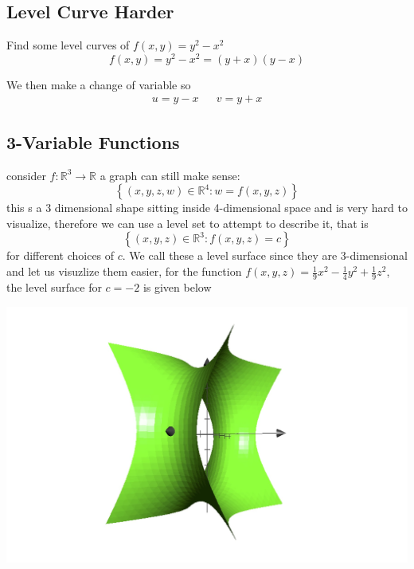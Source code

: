 \documentclass[11pt]{book}
\begin{document}

\subsection{Level Curve Harder}%
\label{sub:level_curve_harder}

Find some level curves of $f\left(x,y\right) = y^2  - x^2 $ 
\[
    f\left(x,y\right) = y^2  - x^2 = \left( y + x \right) \left( y  - x \right) 
\]

We then make a change of variable so 
\begin{align*}
    u = y  - x && v= y + x
\end{align*}




\subsection{3-Variable Functions}%
\label{sub:3_variable_functions}

consider $f : \mathbb{R} ^{3}  \to \mathbb{R} $ a graph can still make sense: 
\[
    \left\{ \left( x,y,z,w \right) \in \mathbb{R} ^{4} : w= f\left(x,y,z\right)  \right\} 
\]
this s a 3 dimensional shape sitting inside 4-dimensional space and is very hard to visualize, therefore we can use a level set to attempt to describe it, that is 
\[
    \left\{ \left( x,y,z \right) \in  \mathbb{R}^{3} : f\left( x,y,z \right) = c \right\} 
\]
for different choices of $c$. We call these a level surface since they are 3-dimensional and let us visuzlize them easier, for the function $f\left(x,y,z\right) = \frac{1}{9}x^2  - \frac{1}{4}y^2  + \frac{1}{9}z^2 $,  the level surface for $c= -2$ is given below

\begin{center}
    \includegraphics[width=\textwidth]{assets/-2-surf.jpg} 
\end{center}
\end{document}
